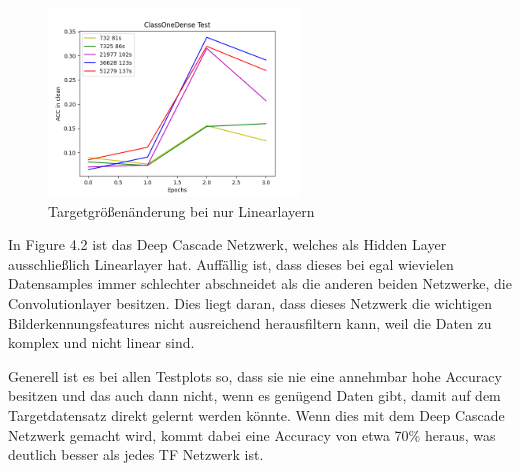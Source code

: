 \begin{figure}[htpb]
    \centering
    \includegraphics[height=5cm]{../../Plots/ba_plots/targetgroesse/cod_ts.png}
    \caption{\label{fig:targetgroesselinear} Targetgrößenänderung bei nur Linearlayern}
\end{figure}

In Figure 4.2 ist das Deep Cascade Netzwerk, welches als Hidden Layer ausschließlich Linearlayer hat. Auffällig ist, dass dieses bei egal 
wievielen Datensamples immer schlechter abschneidet als die anderen beiden Netzwerke, die Convolutionlayer besitzen. 
Dies liegt daran, dass dieses Netzwerk die wichtigen Bilderkennungsfeatures nicht ausreichend herausfiltern kann, weil die Daten zu komplex und 
nicht linear sind. 

Generell ist es bei allen Testplots so, dass sie nie eine annehmbar hohe Accuracy besitzen und das auch dann nicht, wenn es genügend Daten 
gibt, damit auf dem Targetdatensatz direkt gelernt werden könnte. Wenn dies mit dem Deep Cascade Netzwerk gemacht wird, kommt dabei eine 
Accuracy von etwa 70\% heraus, was deutlich besser als jedes TF Netzwerk ist. 
